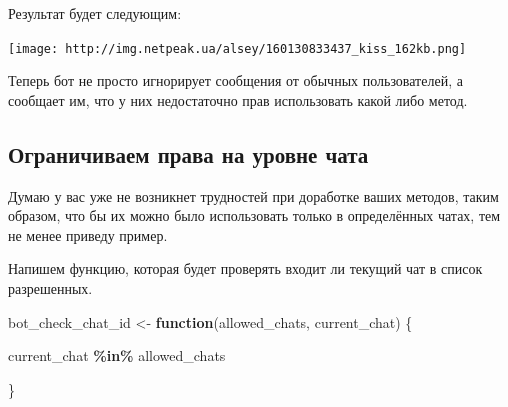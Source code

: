 \documentclass[
]{book}
\newenvironment{Shaded}{\begin{snugshade}}{\end{snugshade}}
\newcommand{\CommentTok}[1]{\textcolor[rgb]{0.56,0.35,0.01}{\textit{#1}}}
\newcommand{\ControlFlowTok}[1]{\textcolor[rgb]{0.13,0.29,0.53}{\textbf{#1}}}
\newcommand{\FunctionTok}[1]{\textcolor[rgb]{0.13,0.29,0.53}{\textbf{#1}}}
\newcommand{\NormalTok}[1]{#1}
\newcommand{\OtherTok}[1]{\textcolor[rgb]{0.56,0.35,0.01}{#1}}
\newcommand{\SpecialCharTok}[1]{\textcolor[rgb]{0.81,0.36,0.00}{\textbf{#1}}}
\newcommand{\StringTok}[1]{\textcolor[rgb]{0.31,0.60,0.02}{#1}}
\begin{document}
\begin{Shaded}
\end{Shaded}

Результат будет следующим:

\texttt{[image: http://img.netpeak.ua/alsey/160130833437\_kiss\_162kb.png]}

Теперь бот не просто игнорирует сообщения от обычных пользователей, а сообщает им, что у них недостаточно прав использовать какой либо метод.

\subsection{Ограничиваем права на уровне чата}\label{ux43eux433ux440ux430ux43dux438ux447ux438ux432ux430ux435ux43c-ux43fux440ux430ux432ux430-ux43dux430-ux443ux440ux43eux432ux43dux435-ux447ux430ux442ux430-1}

Думаю у вас уже не возникнет трудностей при доработке ваших методов, таким образом, что бы их можно было использовать только в определённых чатах, тем не менее приведу пример.

Напишем функцию, которая будет проверять входит ли текущий чат в список разрешенных.

\begin{Shaded}
\begin{Highlighting}[]
\NormalTok{bot\_check\_chat\_id }\OtherTok{\textless{}{-}} 
  \ControlFlowTok{function}\NormalTok{(allowed\_chats, current\_chat) \{}

\NormalTok{     current\_chat }\SpecialCharTok{\%in\%}\NormalTok{ allowed\_chats }
    
\NormalTok{\}}
\end{Highlighting}
\end{Shaded}
\end{document}
